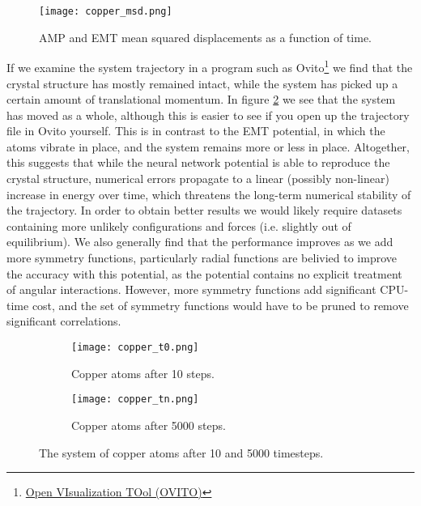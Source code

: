 \begin{figure}[H]
    \centering
    \texttt{[image: copper\_msd.png]}
    \caption{AMP and EMT mean squared displacements as a function of time.}
    \label{fig:copper-msd}
\end{figure}

If we examine the system trajectory in a program such as Ovito\footnote{
    \href{https://www.ovito.org/}{Open VIsualization TOol (OVITO)}}
we find that the crystal structure has mostly remained intact, while the
system has picked up a certain amount of translational momentum.
In figure \ref{fig:copper_sw} we see that the system has moved as a whole,
although this is easier to see if you open up the trajectory file in Ovito
yourself.
This is in contrast to the EMT potential, in which the atoms vibrate in place,
and the system remains more or less in place.
Altogether, this suggests that while the neural network potential
is able to reproduce the crystal structure, numerical errors propagate
to a linear (possibly non-linear)
increase in energy over time, which threatens the long-term numerical
stability of the trajectory. In order to obtain better results we would likely
require datasets containing more unlikely configurations and forces
(i.e. slightly out of equilibrium). We also generally find that the performance
improves as we add more symmetry functions, particularly radial functions
are belivied to improve the accuracy with this potential,
as the potential contains no explicit treatment of angular interactions.
However, more symmetry functions add significant CPU-time cost,
and the set of symmetry functions would have to be pruned
to remove significant correlations.

\begin{figure}[H]
\begin{adjustbox}{max width=1.2\linewidth,center}
\centering
  \begin{subfigure}[b]{0.55\textwidth}
      \texttt{[image: copper\_t0.png]}
      \caption{Copper atoms after 10 steps.}
  \end{subfigure}
  \hfill
  \begin{subfigure}[b]{0.55\textwidth}
      \texttt{[image: copper\_tn.png]}
      \caption{Copper atoms after 5000 steps.}
  \end{subfigure}
\end{adjustbox}
    \caption{The system of copper atoms after 10 and 5000 timesteps.}
    \label{fig:copper_sw}
\end{figure}

